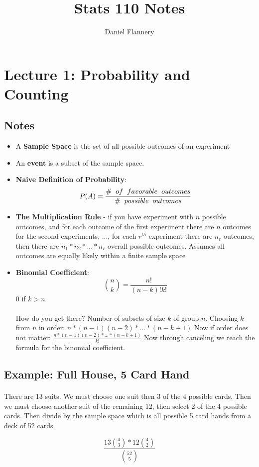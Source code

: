 \documentclass[11pt, oneside]{article}   	%
\title{Stats 110 Notes}
\author{Daniel Flannery}
\begin{document}
\maketitle
\tableofcontents

\section{Lecture 1: Probability and Counting}					%
	\subsection{Notes}
	\begin{itemize}
		\item A \textbf{Sample Space} is the set of all possible outcomes of an experiment
		\item An \textbf{event} is a subset of the sample space.
		\item \textbf{Naive Definition of Probability}: \[P(A) = \frac{\# \hspace{2mm} of \hspace{2mm} favorable \hspace{2mm} outcomes}{\# \hspace{2mm} possible \hspace{2mm} outcomes}\]
		\item \textbf{The Multiplication Rule} - if you have experiment with $n$ possible outcomes, and for each outcome of the first experiment there 		are $n$ outcomes for the second experiments, ..., for each $r^{th}$ experiment there are $n_{r}$ outcomes, then there are $n_{1}*n_{2}*...*n_{r}$ overall possible outcomes.
		Assumes all outcomes are equally likely within a finite sample space
		\item \textbf{Binomial Coefficient}: \[ \binom{n}{k} = \frac{n!}{(n-k)!k!} \] $0$ if $k > n$\\
		\\
		How do you get there?
		Number of subsets of size $k$ of group $n$. Choosing $k$ from $n$ in order: $n*(n-1)(n-2)*...*(n-k+1)$
		Now if order does not matter: $\frac{n*(n-1)(n-2)*...*(n-k+1)}{k!}$
		Now through canceling we reach the formula for the binomial coefficient.
		\end{itemize}
	\subsection{Example: Full House, 5 Card Hand}
		\paragraph{}
			There are 13 suits. We must choose one suit then 3 of the 4 possible cards. Then we must choose another suit of the remaining 12, then select 2 of the 4 possible cards. Then divide by the sample space which is all possible 5 card hands from a deck of 52 cards.
		\begin{center}
			\[ \frac{13\binom{4}{3} * 12\binom{4}{2}}{\binom{52}{5}} \]
		\end{center}
\end{document}
